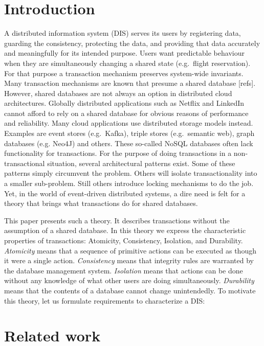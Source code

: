 \documentclass{elsarticle}
\begin{document}
\section{Introduction}
\label{sct:Introduction}
	A distributed information system (DIS) serves its users by registering data, guarding the consistency, protecting the data,
	and providing that data accurately and meaningfully for its intended purpose.
	Users want predictable behaviour when they are simultaneously changing a shared state (e.g.\ flight reservation).
	For that purpose a transaction mechanism preserves system-wide invariants.
	Many transaction mechanisms are known that presume a shared database [refs].
	However, shared databases are not always an option in distributed cloud architectures.
	Globally distributed applications such as Netflix and LinkedIn cannot afford to rely on a shared database for obvious reasons of performance and reliability.
	Many cloud applications use distributed storage models instead.
	Examples are event stores (e.g.\ Kafka), triple stores (e.g.\ semantic web), graph databases (e.g. Neo4J) and others.
	These so-called NoSQL databases often lack functionality for transactions.
	For the purpose of doing transactions in a non-transactional situation, several architectural patterns exist.
	Some of these patterns simply circumvent the problem.
	Others will isolate transactionality into a smaller sub-problem.
	Still others introduce locking mechanisms to do the job.
	Yet, in the world of event-driven distributed systems, a dire need is felt for a theory that brings what transactions do for shared databases.
	
	This paper presents such a theory.
	It describes transactions without the assumption of a shared database.
	In this theory we express the characteristic properties of transactions: Atomicity, Consistency, Isolation, and Durability.
	{\em Atomicity} means that a sequence of primitive actions can be executed as though it were a single action.
	{\em Consistency} means that integrity rules are warranted by the database management system.
	{\em Isolation} means that actions can be done without any knowledge of what other users are doing simultaneously.
	{\em Durability} means that the contents of a database cannot change unintendedly.
	To motivate this theory, let us formulate requirements to characterize a DIS:

\section{Related work}
\label{sct:Related work}
\cite{Foster17c}
\end{document}
